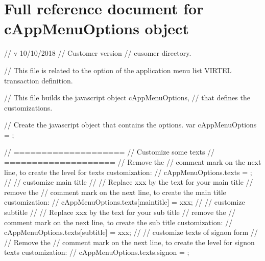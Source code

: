 \documentclass[letterpaper,10pt,english]{sphinxmanual}
\begin{document}
\section{Full reference document for cAppMenuOptions object}
\label{\detokenize{Customization:full-reference-document-for-cappmenuoptions-object}}
\begin{sphinxVerbatim}[commandchars=\\\{\}]
// v 10/10/2018
// Customer version
// cusomer directory.

// This file is related to the option of the application menu list VIRTEL transaction definition.


// This file builds the javascript object cAppMenuOptions,
// that defines the customizations.

// Create the javascript object that contains the options.
var cAppMenuOptions = \PYGZob{}\PYGZcb{};

// ====================
// Customize some texts
// ====================
// Remove the // comment mark on the next line, to create the level for texts customization:
// cAppMenuOptions.texts = \PYGZob{}\PYGZcb{};
//
// customize main title
// \PYGZhy{}\PYGZhy{}\PYGZhy{}\PYGZhy{}\PYGZhy{}\PYGZhy{}\PYGZhy{}\PYGZhy{}\PYGZhy{}\PYGZhy{}\PYGZhy{}\PYGZhy{}\PYGZhy{}\PYGZhy{}\PYGZhy{}\PYGZhy{}\PYGZhy{}\PYGZhy{}\PYGZhy{}\PYGZhy{}
// Replace xxx by the text for your main title
// remove the // comment mark on the next line, to create the main title customization:
// cAppMenuOptions.texts[\PYGZdq{}main\PYGZhy{}title\PYGZdq{}] = \PYGZdq{}xxx\PYGZdq{};
//
// customize subtitle
// \PYGZhy{}\PYGZhy{}\PYGZhy{}\PYGZhy{}\PYGZhy{}\PYGZhy{}\PYGZhy{}\PYGZhy{}\PYGZhy{}\PYGZhy{}\PYGZhy{}\PYGZhy{}\PYGZhy{}\PYGZhy{}\PYGZhy{}\PYGZhy{}\PYGZhy{}\PYGZhy{}
// Replace xxx by the text for your sub title
// remove the // comment mark on the next line, to create the sub title customization:
// cAppMenuOptions.texts[\PYGZdq{}sub\PYGZhy{}title\PYGZdq{}] = \PYGZdq{}xxx\PYGZdq{};
//
// customize texts of signon form
// \PYGZhy{}\PYGZhy{}\PYGZhy{}\PYGZhy{}\PYGZhy{}\PYGZhy{}\PYGZhy{}\PYGZhy{}\PYGZhy{}\PYGZhy{}\PYGZhy{}\PYGZhy{}\PYGZhy{}\PYGZhy{}\PYGZhy{}\PYGZhy{}\PYGZhy{}\PYGZhy{}\PYGZhy{}\PYGZhy{}\PYGZhy{}\PYGZhy{}\PYGZhy{}\PYGZhy{}\PYGZhy{}\PYGZhy{}\PYGZhy{}\PYGZhy{}\PYGZhy{}\PYGZhy{}
// Remove the // comment mark on the next line, to create the level for signon texts customization:
// cAppMenuOptions.texts.signon = \PYGZob{}\PYGZcb{};


\end{sphinxVerbatim}
\end{document}
